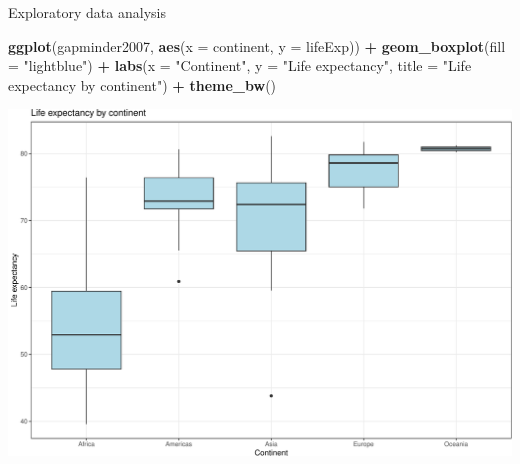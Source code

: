\documentclass[
  ignorenonframetext,
]{beamer}
\newenvironment{Shaded}{\begin{snugshade}}{\end{snugshade}}
\newcommand{\AttributeTok}[1]{\textcolor[rgb]{0.13,0.29,0.53}{#1}}
\newcommand{\FunctionTok}[1]{\textcolor[rgb]{0.13,0.29,0.53}{\textbf{#1}}}
\newcommand{\NormalTok}[1]{#1}
\newcommand{\SpecialCharTok}[1]{\textcolor[rgb]{0.81,0.36,0.00}{\textbf{#1}}}
\newcommand{\StringTok}[1]{\textcolor[rgb]{0.31,0.60,0.02}{#1}}
\begin{document}
\begin{frame}[fragile]{Exploratory data analysis}
\protect\hypertarget{exploratory-data-analysis-6}{}
\small

\begin{Shaded}
\begin{Highlighting}[]
\FunctionTok{ggplot}\NormalTok{(gapminder2007, }\FunctionTok{aes}\NormalTok{(}\AttributeTok{x =}\NormalTok{ continent, }\AttributeTok{y =}\NormalTok{ lifeExp)) }\SpecialCharTok{+}
  \FunctionTok{geom\_boxplot}\NormalTok{(}\AttributeTok{fill =} \StringTok{"lightblue"}\NormalTok{) }\SpecialCharTok{+}
  \FunctionTok{labs}\NormalTok{(}\AttributeTok{x =} \StringTok{"Continent"}\NormalTok{, }\AttributeTok{y =} \StringTok{"Life expectancy"}\NormalTok{,}
       \AttributeTok{title =} \StringTok{"Life expectancy by continent"}\NormalTok{) }\SpecialCharTok{+} 
  \FunctionTok{theme\_bw}\NormalTok{()}
\end{Highlighting}
\end{Shaded}

\begin{center}\includegraphics[width=0.8\linewidth,height=0.5\textheight]{Week5_Lect_files/figure-beamer/unnamed-chunk-8-1} \end{center}
\normalsize
\end{frame}
\end{document}
